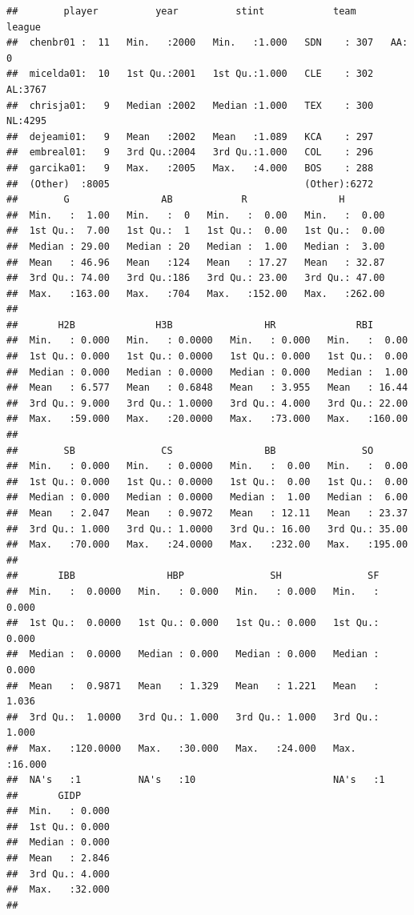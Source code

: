 \documentclass[]{book}
\theoremstyle{definition}
\theoremstyle{definition}
\theoremstyle{definition}
\theoremstyle{remark}
\begin{document}
\begin{verbatim}
##        player          year          stint            team      league   
##  chenbr01 :  11   Min.   :2000   Min.   :1.000   SDN    : 307   AA:   0  
##  micelda01:  10   1st Qu.:2001   1st Qu.:1.000   CLE    : 302   AL:3767  
##  chrisja01:   9   Median :2002   Median :1.000   TEX    : 300   NL:4295  
##  dejeami01:   9   Mean   :2002   Mean   :1.089   KCA    : 297            
##  embreal01:   9   3rd Qu.:2004   3rd Qu.:1.000   COL    : 296            
##  garcika01:   9   Max.   :2005   Max.   :4.000   BOS    : 288            
##  (Other)  :8005                                  (Other):6272            
##        G                AB            R                H         
##  Min.   :  1.00   Min.   :  0   Min.   :  0.00   Min.   :  0.00  
##  1st Qu.:  7.00   1st Qu.:  1   1st Qu.:  0.00   1st Qu.:  0.00  
##  Median : 29.00   Median : 20   Median :  1.00   Median :  3.00  
##  Mean   : 46.96   Mean   :124   Mean   : 17.27   Mean   : 32.87  
##  3rd Qu.: 74.00   3rd Qu.:186   3rd Qu.: 23.00   3rd Qu.: 47.00  
##  Max.   :163.00   Max.   :704   Max.   :152.00   Max.   :262.00  
##                                                                  
##       H2B              H3B                HR              RBI        
##  Min.   : 0.000   Min.   : 0.0000   Min.   : 0.000   Min.   :  0.00  
##  1st Qu.: 0.000   1st Qu.: 0.0000   1st Qu.: 0.000   1st Qu.:  0.00  
##  Median : 0.000   Median : 0.0000   Median : 0.000   Median :  1.00  
##  Mean   : 6.577   Mean   : 0.6848   Mean   : 3.955   Mean   : 16.44  
##  3rd Qu.: 9.000   3rd Qu.: 1.0000   3rd Qu.: 4.000   3rd Qu.: 22.00  
##  Max.   :59.000   Max.   :20.0000   Max.   :73.000   Max.   :160.00  
##                                                                      
##        SB               CS                BB               SO        
##  Min.   : 0.000   Min.   : 0.0000   Min.   :  0.00   Min.   :  0.00  
##  1st Qu.: 0.000   1st Qu.: 0.0000   1st Qu.:  0.00   1st Qu.:  0.00  
##  Median : 0.000   Median : 0.0000   Median :  1.00   Median :  6.00  
##  Mean   : 2.047   Mean   : 0.9072   Mean   : 12.11   Mean   : 23.37  
##  3rd Qu.: 1.000   3rd Qu.: 1.0000   3rd Qu.: 16.00   3rd Qu.: 35.00  
##  Max.   :70.000   Max.   :24.0000   Max.   :232.00   Max.   :195.00  
##                                                                      
##       IBB                HBP               SH               SF        
##  Min.   :  0.0000   Min.   : 0.000   Min.   : 0.000   Min.   : 0.000  
##  1st Qu.:  0.0000   1st Qu.: 0.000   1st Qu.: 0.000   1st Qu.: 0.000  
##  Median :  0.0000   Median : 0.000   Median : 0.000   Median : 0.000  
##  Mean   :  0.9871   Mean   : 1.329   Mean   : 1.221   Mean   : 1.036  
##  3rd Qu.:  1.0000   3rd Qu.: 1.000   3rd Qu.: 1.000   3rd Qu.: 1.000  
##  Max.   :120.0000   Max.   :30.000   Max.   :24.000   Max.   :16.000  
##  NA's   :1          NA's   :10                        NA's   :1       
##       GIDP       
##  Min.   : 0.000  
##  1st Qu.: 0.000  
##  Median : 0.000  
##  Mean   : 2.846  
##  3rd Qu.: 4.000  
##  Max.   :32.000  
## 
\end{verbatim}
\end{document}
